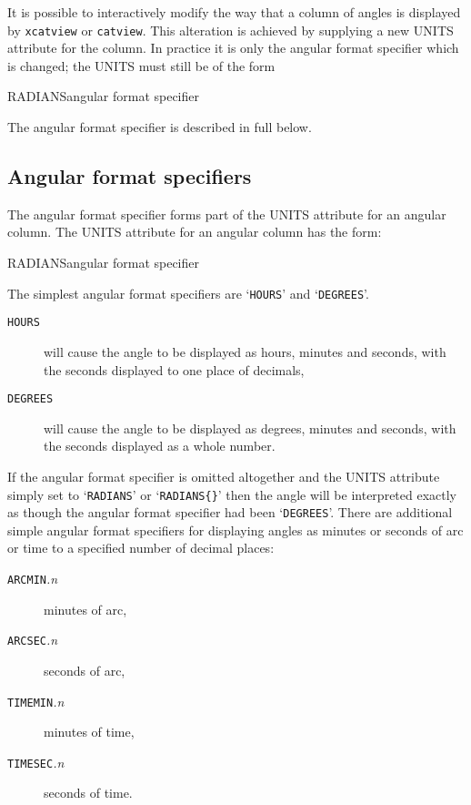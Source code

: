 \documentclass[twoside,11pt]{starlink}
\begin{document}
It is possible to interactively modify the way that a column of angles
is displayed by \texttt{xcatview} or \texttt{catview}. This alteration is
achieved by supplying a new UNITS attribute for the column. In practice
it is only the angular format specifier which is changed; the UNITS must
still be of the form

\begin{terminalv}
RADIANS{angular format specifier}
\end{terminalv}

The angular format specifier is described in full below.

\subsection{Angular format specifiers}

The angular format specifier forms part of the UNITS attribute for an
angular column. The UNITS attribute for an angular column has the
form:

\begin{terminalv}
RADIANS{angular format specifier}
\end{terminalv}

The simplest angular format specifiers are `\texttt{HOURS}' and
`\texttt{DEGREES}'.

\begin{description}

  \item[\texttt{HOURS}] will cause the angle to be displayed as
   hours, minutes and seconds, with the seconds displayed to one
   place of decimals,

  \item[\texttt{DEGREES}] will cause the angle to be displayed as
   degrees, minutes and seconds, with the seconds displayed as a
   whole number.

\end{description}

If the angular format specifier is omitted altogether and
the UNITS attribute simply set to `\texttt{RADIANS}' or `\texttt{RADIANS\{\}}' then the angle will be interpreted exactly as
though the angular format specifier had been `\texttt{DEGREES}'.
There are additional simple angular format specifiers for displaying
angles as minutes or seconds of arc or time to a specified number of
decimal places:

\begin{description}

  \item[\texttt{ARCMIN}\textit{.n}] minutes of arc,

  \item[\texttt{ARCSEC}\textit{.n}] seconds of arc,

  \item[\texttt{TIMEMIN}\textit{.n}] minutes of time,

  \item[\texttt{TIMESEC}\textit{.n}] seconds of time.


\end{description}
\end{document}
